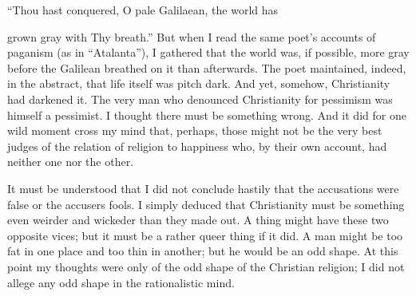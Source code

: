 “Thou hast conquered, O pale Galilaean, the world has

grown gray with Thy breath.” But when I read the same poet’s accounts of paganism (as in “Atalanta”), I gathered that the world was, if possible, more gray before the Galilean breathed on it than afterwards. The poet maintained, indeed, in the abstract, that life itself was pitch dark. And yet, somehow, Christianity had darkened it. The very man who denounced Christianity for pessimism was himself a pessimist. I thought there must be something wrong. And it did for one wild moment cross my mind that, perhaps, those might not be the very best judges of the relation of religion to happiness who, by their own account, had neither one nor the other.

It must be understood that I did not conclude hastily that the accusations were false or the accusers fools. I simply deduced that Christianity must be something even weirder and wickeder than they made out. A thing might have these two opposite vices; but it must be a rather queer thing if it did. A man might be too fat in one place and too thin in another; but he would be an odd shape. At this point my thoughts were only of the odd shape of the Christian religion; I did not allege any odd shape in the rationalistic mind.


